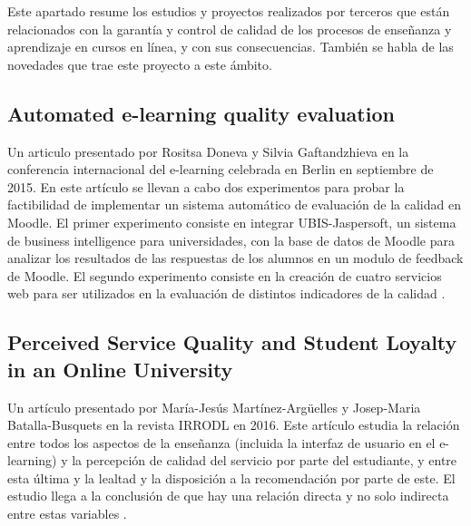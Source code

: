 
Este apartado resume los estudios y proyectos realizados por terceros que están relacionados con la garantía y control de calidad de los procesos de enseñanza y aprendizaje en cursos en línea, y con sus consecuencias. También se habla de las novedades que trae este proyecto a este ámbito.

\subsection{Automated e-learning quality evaluation}
Un articulo presentado por Rositsa Doneva y Silvia Gaftandzhieva en la conferencia internacional del e-learning celebrada en Berlin en septiembre de 2015.
En este artículo se llevan a cabo dos experimentos para probar la factibilidad de implementar un sistema automático de evaluación de la calidad en Moodle. El primer experimento consiste en integrar UBIS-Jaspersoft, un sistema de business intelligence para universidades, con la base de datos de Moodle para analizar los resultados de las respuestas de los alumnos en un modulo de feedback de Moodle. El segundo experimento consiste en la creación de cuatro servicios web para ser utilizados en la evaluación de distintos indicadores de la calidad \cite{doneva2015automated}.

\subsection{Perceived Service Quality and Student Loyalty in an Online University}
Un artículo presentado por María-Jesús Martínez-Argüelles y Josep-Maria Batalla-Busquets en la revista IRRODL en 2016.
Este artículo estudia la relación entre todos los aspectos de la enseñanza (incluida la interfaz de usuario en el e-learning) y la percepción de calidad del servicio por parte del estudiante, y entre esta última y la lealtad y la disposición a la recomendación por parte de este. El estudio llega a la conclusión de que hay una relación directa y no solo indirecta entre estas variables \cite{martinez2016perceived}.

